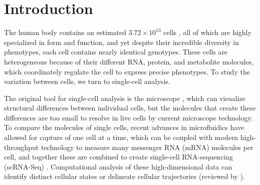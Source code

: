 






\section{Introduction}
The human body contains an estimated $3.72\times 10^{13}$ cells  \cite{Bianconi2013-jr}, all of which are highly specialized in form and function, and yet despite their incredible diversity in phenotypes, each cell contains nearly identical genotypes. These cells are heterogeneous because of their different RNA, protein, and metabolite molecules, which coordinately regulate the cell to express precise phenotypes. To study the variation between cells, we turn to single-cell analysis.

The original tool for single-cell analysis is the microscope  \cite{Hooke1665-bk,Van_Leeuwenhoek_undated-gu}, which can visualize structural differences between individual cells, but the molecules that create these differences are too small to resolve in live cells by current microscope technology. To compare the molecules of single cells, recent advances in microfluidics have allowed for capture of one cell at a time, which can be coupled with modern high-throughput technology to measure many messenger RNA (mRNA) molecules per cell, and together these are combined to create single-cell RNA-sequencing (scRNA-Seq)  \cite{Kolodziejczyk2015-wj,Ziegenhain2016-gb}. Computational analysis of these high-dimensional data can identify distinct cellular states or delineate cellular trajectories (reviewed by  \citet{Bacher2016-ze,Cannoodt2016-mt,Liu2016-cw,Trapnell2015-vn,Stegle2015-tl}).

